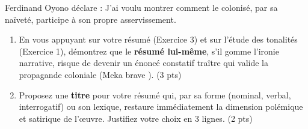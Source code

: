 \documentclass[11pt]{article}
\begin{document}
\begin{exercice}
Ferdinand Oyono déclare : \og J'ai voulu montrer comment le colonisé, par sa naïveté, participe à son propre asservissement. \fg{}

\begin{enumerate}
    \item En vous appuyant sur votre résumé (Exercice 3) et sur l'étude des tonalités (Exercice 1), démontrez que le \textbf{résumé lui-même}, s'il gomme l'ironie narrative, risque de devenir un énoncé constatif \og traître \fg{} qui valide la propagande coloniale (Meka \og brave \fg{}). (3 pts)
    \item Proposez une \textbf{titre} pour votre résumé qui, par sa forme (nominal, verbal, interrogatif) ou son lexique, restaure immédiatement la dimension polémique et satirique de l'œuvre. Justifiez votre choix en 3 lignes. (2 pts)
\end{enumerate}
\end{exercice}
\end{document}
